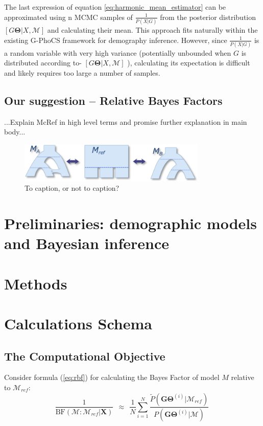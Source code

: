 \documentclass[11pt]{article}
\newcommand{\vect}[1]{\boldsymbol{\mathbf{#1}}}
\newcommand{\X}{\vect{X}}
\newcommand{\M}{\mathcal{M}}
\newcommand{\G}{\vect{G}}
\newcommand{\T}{\vect{\Theta}}
\newcommand{\GT}{\G\T}
\newcommand{\Mref}{\M_{ref}}
\newcommand{\Pref}{\widetilde{P}}
\newcommand{\rbf}{\text{BF}}
\newcommand{\1}{\mathbbm{1}}
\newcommand{\gp}{G-PhoCS }
\begin{document}
The last expression of equation \ref{eq:harmonic_mean_estimator} can be approximated using n MCMC samples of $\frac{1}{P(X|G)}$ from the posterior distribution $[G \T|X, \M]$ and calculating their mean. This approach fits naturally within the existing \gp framework for demography inference. However, since $\frac{1}{P(X|G)}$ is a random variable with very high variance (potentially unbounded when $G$ is distributed according to- $[G\T|X, \M]$ ), calculating its expectation is difficult and likely requires too large a number of samples.


\subsection{Our suggestion – Relative Bayes Factors}
...Explain McRef in high level terms and promise further explanation in main body...


\begin{figure}[h]
\centering
\includegraphics[width=0.8\textwidth]
{A_vs_B_via_ref}
\caption{To caption, or not to caption?}
\label{fig:model_A__OR__model_b}
\end{figure}



\newpage


\section{Preliminaries: demographic models and Bayesian inference}

\section{Methods}

\newpage

\section{Calculations Schema}

\subsection{The Computational Objective}

Consider formula (\ref{eq:rbf}) for calculating the Bayes Factor of model $M$ relative to $\Mref$:
%
%
\begin{equation}
 \frac{1}{\rbf(\M:\Mref|\X)}  ~~\approx~~ \frac{1}{N} \sum_{i=1}^{N}\frac{\Pref(\GT^{(i)}|\Mref) }{P(\GT^{(i)}|\M)} ~ 
\end{equation}
\end{document}
